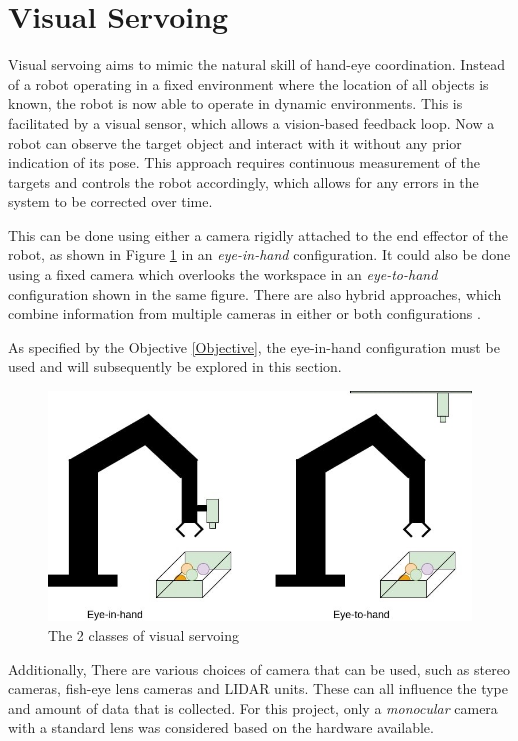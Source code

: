 \documentclass{UoNMCHA}
\numberwithin{equation}{section}
\begin{document}
\newpage
\section{Visual Servoing}

Visual servoing aims to mimic the natural skill of hand-eye coordination. Instead of a robot operating in a fixed environment where the location of all objects is known, the robot is now able to operate in dynamic environments. This is facilitated by a visual sensor, which allows a vision-based feedback loop. Now a robot can observe the target object and interact with it without any prior indication of its pose. 
This approach requires continuous measurement of the targets and controls the robot accordingly, which allows for any errors in the system to be corrected over time.

This can be done using either a camera rigidly attached to the end effector of the robot, as shown in Figure \ref{fig:eyeinhandvseyeinsky} in an \textit{eye-in-hand} configuration. It could also be done using a fixed camera which overlooks the workspace in an \textit{eye-to-hand} configuration shown in the same figure. There are also hybrid approaches, which combine information from multiple cameras in either or both configurations \citep{tsai2014hybrid}. \

As specified by the Objective \ref{Objective}, the eye-in-hand configuration must be used and will subsequently be explored in this section.

\begin{figure}[H]
	\begin{center}
		\includegraphics[width=.6\linewidth]{Figures/eyeinhandvseyeinsky}
		\caption{The 2 classes of visual servoing}
		\label{fig:eyeinhandvseyeinsky}
	\end{center}
\end{figure}

Additionally, There are various choices of camera that can be used, such as stereo cameras, fish-eye lens cameras and LIDAR units. These can all influence the type and amount of data that is collected. For this project, only a \textit{monocular} camera with a standard lens was considered based on the hardware available.
\end{document}
